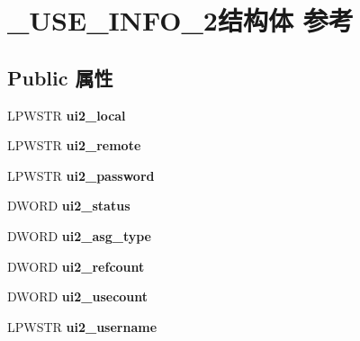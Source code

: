 \hypertarget{struct___u_s_e___i_n_f_o__2}{}\section{\+\_\+\+U\+S\+E\+\_\+\+I\+N\+F\+O\+\_\+2结构体 参考}
\label{struct___u_s_e___i_n_f_o__2}
\subsection*{Public 属性}
\begin{DoxyCompactItemize}
\item 
\mbox{\label{struct___u_s_e___i_n_f_o__2_a135313c139ee2466a1b4e50ad9ebc001}} 
L\+P\+W\+S\+TR {\bfseries ui2\+\_\+local}
\item 
\mbox{\label{struct___u_s_e___i_n_f_o__2_a8801ba54f6e96e4049ad6c3075dcb361}} 
L\+P\+W\+S\+TR {\bfseries ui2\+\_\+remote}
\item 
\mbox{\label{struct___u_s_e___i_n_f_o__2_ad769e1cfaa0ea70224a43da4595bce62}} 
L\+P\+W\+S\+TR {\bfseries ui2\+\_\+password}
\item 
\mbox{\label{struct___u_s_e___i_n_f_o__2_a4cade30cdf4a39d910dc9514877a851c}} 
D\+W\+O\+RD {\bfseries ui2\+\_\+status}
\item 
\mbox{\label{struct___u_s_e___i_n_f_o__2_a5ee60d6e7977078730aa762b51353034}} 
D\+W\+O\+RD {\bfseries ui2\+\_\+asg\+\_\+type}
\item 
\mbox{\label{struct___u_s_e___i_n_f_o__2_ae45876789e266dbdd8dddd44c6e17802}} 
D\+W\+O\+RD {\bfseries ui2\+\_\+refcount}
\item 
\mbox{\label{struct___u_s_e___i_n_f_o__2_a6e20f70ec83510a32272ae4337907879}} 
D\+W\+O\+RD {\bfseries ui2\+\_\+usecount}
\item 
\mbox{\label{struct___u_s_e___i_n_f_o__2_a7f96f52d5571e36a41e695fcebfdc761}} 
L\+P\+W\+S\+TR {\bfseries ui2\+\_\+username}
\item 

\end{DoxyCompactItemize}
